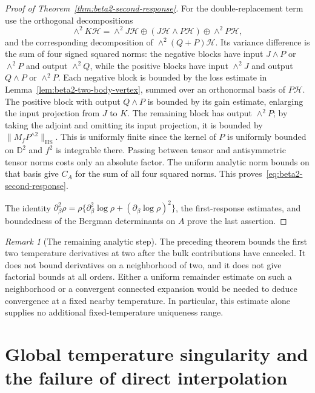 \documentclass[11pt,a4paper]{article}
\numberwithin{equation}{section}
\theoremstyle{definition}
\theoremstyle{remark}
\newtheorem{remark}[theorem]{Remark}
\newcommand{\D}{\mathbb D}
\begin{document}
\begin{proof}[Proof of Theorem~\ref{thm:beta2-second-response}]
For the double-replacement term use the orthogonal decompositions
\[
 \wedge^2K\mathcal H
 =\wedge^2J\mathcal H\oplus(J\mathcal H\wedge P\mathcal H)
                         \oplus\wedge^2P\mathcal H,
\]
and the corresponding decomposition of $\wedge^2(Q+P)\mathcal H$.
Its variance difference is the sum of four signed squared norms:
the negative blocks have input $J\wedge P$ or $\wedge^2P$ and
output $\wedge^2Q$, while the positive blocks have input
$\wedge^2J$ and output $Q\wedge P$ or $\wedge^2P$.
Each negative block is bounded by the loss estimate in
Lemma~\ref{lem:beta2-two-body-vertex}, summed over an orthonormal
basis of $P\mathcal H$.  The positive block with output $Q\wedge P$
is bounded by its gain estimate, enlarging the input projection
from $J$ to $K$.  The remaining block has output $\wedge^2P$;
by taking the adjoint and omitting its input projection, it is
bounded by $\|M_fP^{\wedge2}\|_{\mathrm{HS}}$.  This is uniformly
finite since the kernel of $P$ is uniformly bounded on $\D^2$
and $f^2$ is integrable there.  Passing between tensor and antisymmetric tensor
norms costs only an absolute factor.  The uniform analytic norm
bounds on that basis give $C_A$ for the sum of all four squared
norms.  This proves~\eqref{eq:beta2-second-response}.

The identity
$\partial_\beta^2\rho=\rho\{\partial_\beta^2\log\rho+
(\partial_\beta\log\rho)^2\}$, the first-response estimates,
and boundedness of the Bergman determinants on $A$ prove the
last assertion.
\end{proof}

\begin{remark}[The remaining analytic step]
The preceding theorem bounds the first two temperature derivatives
at two after the bulk contributions have canceled.  It does not
bound derivatives on a neighborhood of two, and it does not give
factorial bounds at all orders.  Either a uniform remainder estimate
on such a neighborhood or a convergent connected expansion would
be needed to deduce convergence at a fixed nearby temperature.
In particular, this estimate alone supplies no additional
fixed-temperature uniqueness range.
\end{remark}

\section{Global temperature singularity and the failure of direct interpolation}
\label{sec:global-temperature-singularity}
\end{document}
